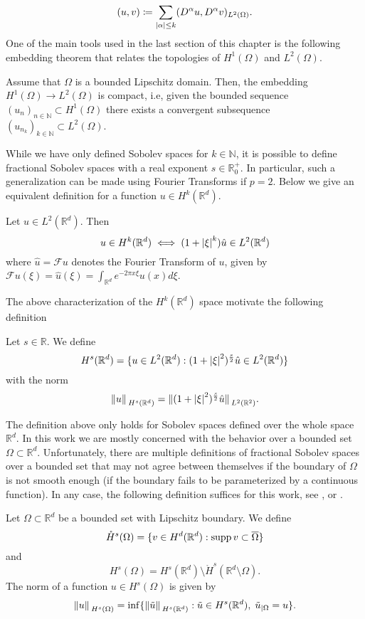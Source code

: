 \[
 (u, v) \coloneqq \sum_{\abs{\alpha} \leq k} (D^\alpha u, D^\alpha v)_{L^2(\Omega)}.
\]
One of the main tools used in the last section of this chapter is the following embedding theorem that relates the topologies of \(H^1(\Omega)\) and \(L^2(\Omega)\).
\begin{theorem}\label{rellich}
    Assume that \(\Omega\) is a bounded Lipschitz domain. Then, the embedding \(H^1(\Omega) \rightarrow L^2(\Omega)\) is compact, i.e, given the bounded sequence \((u_n)_{n \in \mathbb{N}} \subset H^1(\Omega)\) there exists a convergent subsequence \((u_{n_k})_{k \in \mathbb{N}} \subset L^2(\Omega)\).
\end{theorem}
While we have only defined Sobolev spaces for \(k \in \mathbb{N}\), it is possible to define fractional Sobolev spaces with a real exponent \(s \in \mathbb{R}_0^+\). In particular, such a generalization can be made using Fourier Transforms if \(p=2\). Below we give an equivalent definition for a function \(u \in H^k(\mathbb{R}^d)\).
\begin{lemma}
    Let \(u \in L^2(\mathbb{R}^d)\). Then
    \[
    u \in H^k(\mathbb{R}^d) \iff (1+ \abs{\xi}^k)\hat{u} \in L^2(\mathbb{R}^d)
    \]
    where \(\hat{u} = \mathcal{F}u\) denotes the Fourier Transform of \(u\), given by \(\mathcal{F}u(\xi) = \hat{u}(\xi) = \int_{\mathbb{R}^d} e^{-2 \pi x \xi} u(x) d\xi\).
\end{lemma}
The above characterization of the \(H^k(\mathbb{R}^d)\) space motivate the following definition
\begin{definition}
    Let \(s \in \mathbb{R}\). We define
    \[
    H^s(\mathbb{R}^d) = \{u \in L^2(\mathbb{R}^d): (1+ \abs{\xi}^2)^\frac{s}{2}\hat{u} \in L^2(\mathbb{R}^d)\} 
    \]
    with the norm
    \[
        \norm*{u}_{H^s(\mathbb{R}^d)} = \norm*{(1+ \abs{\xi}^2)^\frac{s}{2} \hat{u}}_{L^2(\mathbb{R}^2)}.
    \]
\end{definition}
The definition above only holds for Sobolev spaces defined over the whole space \(\mathbb{R}^d\). In this work we are mostly concerned with the behavior over a bounded set \(\Omega \subset \mathbb{R}^d\). Unfortunately, there are multiple definitions of fractional Sobolev spaces over a bounded set that may not agree between themselves if the boundary of \(\Omega\) is not smooth enough (if the boundary fails to be parameterized by a continuous function). In any case, the following definition suffices for this work, see \cite{bogomolny1985fundamental}, \cite{chandler2017sobolev} or \cite{hewett2017note}.  
\begin{definition}
    Let \(\Omega \subset \mathbb{R}^d\) be a bounded set with Lipschitz boundary. We define
    \[
        \mathring{H}^s(\Omega) = \{v \in H^d(\mathbb{R}^d): \operatorname{supp} v \subset \overline{\Omega}\}
    \]
    and
    \[
        H^s(\Omega) = H^s(\mathbb{R}^d)\setminus \mathring{H}^s(\mathbb{R}^d\setminus\Omega).
    \]
    The norm of a function \(u \in H^s(\Omega)\) is given by
    \[
        \norm*{u}_{H^s(\Omega)} = \inf \{\norm*{\Tilde{u}}_{H^s(\mathbb{R}^d)}: \Tilde{u} \in H^s(\mathbb{R}^d), \; \Tilde{u}_{|\Omega} = u\}.
    \]
\end{definition}

